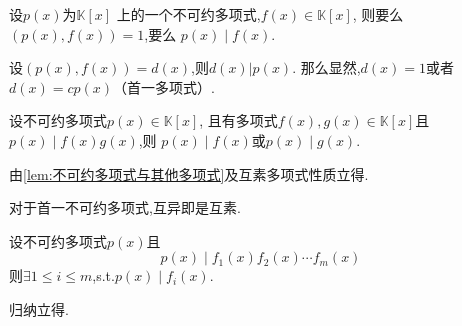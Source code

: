 \begin{green}
\begin{lemma}[不可约多项式与其他多项式]\label{lem:不可约多项式与其他多项式}
    设$p\left(x\right)$为$\mathbb{K}\left[x\right]$
    上的一个不可约多项式,$f\left(x\right)\in \mathbb{K}\left[x\right]$,
    则要么$\left(p\left(x\right),f\left(x\right)\right)=1$,要么
    $p\left(x\right)\mid f\left(x\right)$.
\end{lemma}
\begin{Proof}
设$\left(p\left(x\right),f\left(x\right)\right)=d\left(x\right)$,则$d\left(x\right)|p\left(x\right)$.
那么显然,$d\left(x\right)=1$或者$d\left(x\right)=cp\left(x\right)$（首一多项式）.
\end{Proof}
\end{green}
\begin{formal}
\begin{theorem}[不可约多项式的素性]\label{thm:不可约多项式的素性}
    设不可约多项式$p\left(x\right)\in\mathbb{K}\left[x\right]$,
    且有多项式$f\left(x\right),g\left(x\right)\in\mathbb{K}\left[x\right]$且$p\left(x\right)\mid f\left(x\right)g\left(x\right)$,则
    $p\left(x\right)\mid f\left(x\right)$或$p\left(x\right)\mid g\left(x\right)$.
\end{theorem}
\begin{Proof}
由\cref{lem:不可约多项式与其他多项式}及互素多项式性质立得.
\end{Proof}
\end{formal}
\begin{red}
\begin{remark}
    对于首一不可约多项式,互异即是互素.
\end{remark}
\end{red}
\begin{green}
\begin{corollary}[推广到有限多个多项式]\label{cor:推广到有限多个多项式}
    设不可约多项式$p\left(x\right)$且\[
    p\left(x\right)\mid f_1\left(x\right)f_2\left(x\right)\cdots f_m\left(x\right)
    \]
    则$\exists 1\leqslant i\leqslant m$,\textup{s.t.}$p\left(x\right)\mid f_i\left(x\right)$.
\end{corollary}
\begin{Proof}
归纳立得.
\end{Proof}
\end{green}
